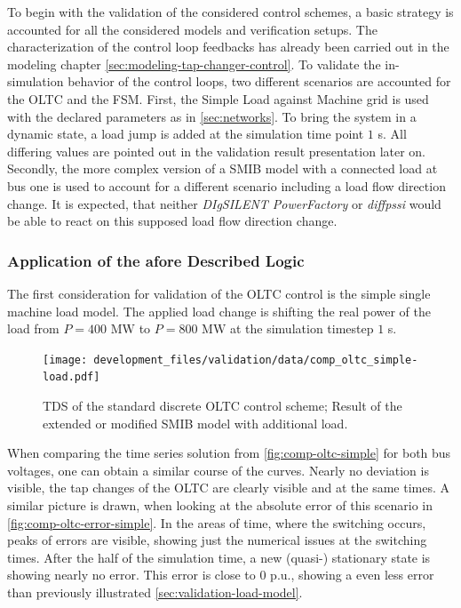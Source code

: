 To begin with the validation of the considered control schemes, a basic strategy is accounted for all the considered models and verification setups.
The characterization of the control loop feedbacks has already been carried out in the modeling chapter \autoref{sec:modeling-tap-changer-control}.
To validate the in-simulation behavior of the control loops, two different scenarios are accounted for the \acs{OLTC} and the \acs{FSM}.
First, the Simple Load against Machine grid is used with the declared parameters as in \autoref{sec:networks}.
To bring the system in a dynamic state, a load jump is added at the simulation time point $1$ s.
All differing values are pointed out in the validation result presentation later on.
Secondly, the more complex version of a \acs{SMIB} model with a connected load at bus one is used to account for a different scenario including a load flow direction change.
It is expected, that neither \textit{DIgSILENT PowerFactory} or \textit{diffpssi} would be able to react on this supposed load flow direction change.

\subsubsection{Application of the afore Described Logic}

The first consideration for validation of the \acs{OLTC} control is the simple single machine load model.
The applied load change is shifting the real power of the load from $P=400\text{ MW}$ to $P=800\text{ MW}$ at the simulation timestep $1$ s.

\begin{figure}[htbp!]
    \centering
    \texttt{[image: development\_files/validation/data/comp\_oltc\_simple-load.pdf]}
    \caption[Time Domain Result of the OLTC control scheme applied on the extended \acs{SMIB} network]{\acf{TDS} of the standard discrete \acs{OLTC} control scheme; Result of the extended or modified \acs{SMIB} model with additional load.}
    \label{fig:comp-oltc-simple}
\end{figure}

When comparing the time series solution from \autoref{fig:comp-oltc-simple} for both bus voltages, one can obtain a similar course of the curves. 
Nearly no deviation is visible, the tap changes of the \acs{OLTC} are clearly visible and at the same times.
A similar picture is drawn, when looking at the absolute error of this scenario in \autoref{fig:comp-oltc-error-simple}.
In the areas of time, where the switching occurs, peaks of errors are visible, showing just the numerical issues at the switching times.
After the half of the simulation time, a new (quasi-) stationary state is showing nearly no error.
This error is close to $0$ p.u., showing a even less error than previously illustrated \autoref{sec:validation-load-model}.

